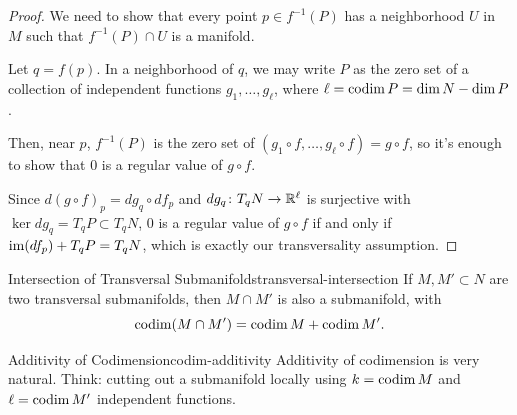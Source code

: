 \begin{proof}
    We need to show that every point $p \in f^{-1}(P)$ has a neighborhood $U$ in $M$ such that $f^{-1}(P) \cap U$ is a manifold.

    Let $q = f(p)$. In a neighborhood of $q$, we may write $P$ as the zero set of a collection of independent functions $g_1, \ldots, g_\ell$, where $\ell = \operatorname{codim} P = \dim N - \dim P$.

    \begin{center}
    \end{center}

    Then, near $p$, $f^{-1}(P)$ is the zero set of $(g_1 \circ f, \ldots, g_\ell \circ f) = g \circ f$, so it's enough to show that $0$ is a regular value of $g \circ f$.

    Since $d(g \circ f)_p = dg_q \circ df_p$ and $dg_q \colon T_q N \to \mathbb{R}^\ell$ is surjective with $\ker dg_q = T_q P \subset T_q N$, $0$ is a regular value of $g \circ f$ if and only if $\operatorname{im}(df_p) + T_q P = T_q N$, which is exactly our transversality assumption.
\end{proof}

\begin{corollary}{Intersection of Transversal Submanifolds}{transversal-intersection}
    If $M, M' \subset N$ are two transversal submanifolds, then $M \cap M'$ is also a submanifold, with
    \[
        \operatorname{codim}(M \cap M') = \operatorname{codim} M + \operatorname{codim} M'.
    \]
\end{corollary}

\begin{remark}{Additivity of Codimension}{codim-additivity}
    Additivity of codimension is very natural. Think: cutting out a submanifold locally using $k = \operatorname{codim} M$ and $\ell = \operatorname{codim} M'$ independent functions.
\end{remark}

